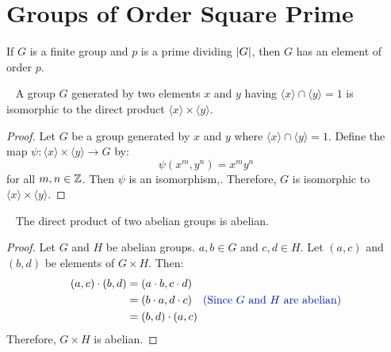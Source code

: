 \section{Groups of Order Square Prime}

\begin{theorem}\label{thm:cauchy}
  If $G$ is a finite group and $p$ is a prime dividing $\lvert G\rvert$,
  then $G$ has an element of order $p$.~\cite[p.~93,~Theorem~3.1]{DummitFoote} 
\end{theorem}

\begin{proposition}~\label{prop:trivial-isom-direct-product}
  A group $G$ generated by two elements $x$ and $y$
  having $\langle x \rangle \cap \langle y \rangle = 1$
  is isomorphic to the direct product $\langle x \rangle \times \langle y \rangle$.

  \begin{proof}
    Let $G$ be a group generated by $x$ and $y$
    where $\langle x \rangle \cap \langle y \rangle = 1$.
    Define the map $\psi: \langle x \rangle \times \langle y \rangle \to G$ by:
    \[ \psi(x^m, y^n) = x^my^n \]
    for all $m, n \in \mathbb{Z}$.
    Then $\psi$ is an isomorphism,.
    Therefore, $G$ is isomorphic to $\langle x \rangle \times \langle y \rangle$.
  \end{proof}
\end{proposition}

\begin{proposition}~\label{prop:abelian-dir-prod-abelian}
  The direct product of two abelian groups is abelian.

  \begin{proof}
    Let $G$ and $H$ be abelian groups.
    $a, b \in G$ and $c, d \in H$.
    Let $(a, c)$ and $(b, d)$ be elements of $G \times H$.
    Then:
    \begin{align*}
      (a, c) \cdot (b, d) &= (a \cdot b, c \cdot d) \\
                          &= (b \cdot a, d \cdot c) \quad \zaff{\text{(Since $G$ and $H$ are abelian)}} \\
                          &= (b, d) \cdot (a, c)
    \end{align*}
    Therefore, $G \times H$ is abelian.
  \end{proof}
\end{proposition}

